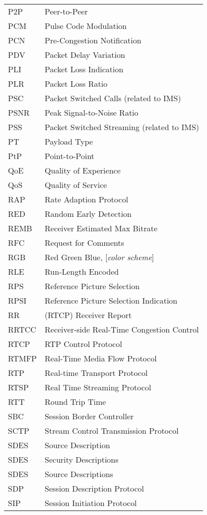 \begin{longtable}{ll}
P2P 	& Peer-to-Peer \\
PCM 	& Pulse Code Modulation \\
PCN 	& Pre-Congestion Notification \\
PDV 	& Packet Delay Variation \\
PLI 	& Packet Loss Indication \\
PLR 	& Packet Loss Ratio \\
PSC 	& Packet Switched Calls (related to IMS)\\
PSNR	& Peak Signal-to-Noise Ratio \\
PSS 	& Packet Switched Streaming (related to IMS)\\
PT  	& Payload Type \\
PtP 	& Point-to-Point \\
QoE 	& Quality of Experience \\
QoS 	& Quality of Service \\
RAP 	& Rate Adaption Protocol \\
RED 	& Random Early Detection \\
REMB 	& Receiver Estimated Max Bitrate \\
RFC 	& Request for Comments \\
RGB 	& Red Green Blue, [\textit{color scheme}] \\
RLE 	& Run-Length Encoded \\
RPS 	& Reference Picture Selection \\
RPSI 	& Reference Picture Selection Indication \\
RR  	& (RTCP) Receiver Report \\
RRTCC	& Receiver-side Real-Time Congestion Control \\
RTCP 	& RTP Control Protocol \\
RTMFP	& Real-Time Media Flow Protocol \\
RTP 	& Real-time Transport Protocol \\
RTSP 	& Real Time Streaming Protocol \\
RTT 	& Round Trip Time \\
SBC  	& Session Border Controller \\
SCTP 	& Stream Control Transmission Protocol \\
SDES 	& Source Description \\
SDES 	& Security Descriptions \\
SDES	& Source Descriptions \\
SDP 	& Session Description Protocol \\
SIP 	& Session Initiation Protocol \\

\end{longtable}
